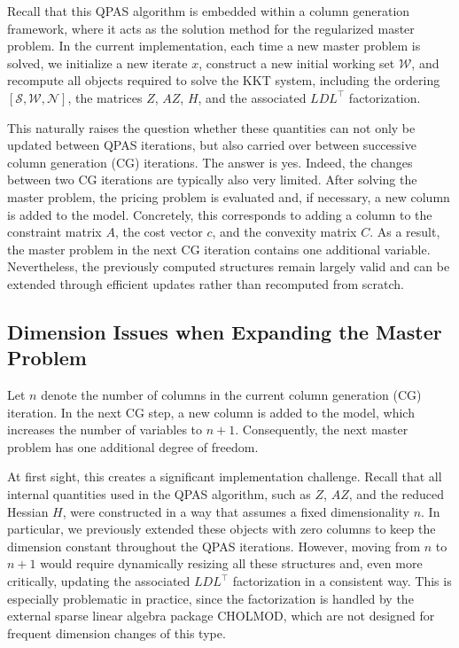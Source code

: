 \documentclass{book}
\theoremstyle{definition}
\newcounter{algorithm_}
\numberwithin{algorithm_}{chapter}
\begin{document}
{\bigskip

Recall that this QPAS algorithm is embedded within a column generation framework, where it acts as the solution method for the regularized master problem. In the current implementation, each time a new master problem is solved, we initialize a new iterate $x$, construct a new initial working set $\mathcal{W}$, and recompute all objects required to solve the KKT system, including the ordering $[\mathcal{S}, \mathcal{W}, \mathcal{N}]$, the matrices $Z$, $AZ$, $H$, and the associated $LDL^\top$ factorization.

\bigskip

This naturally raises the question whether these quantities can not only be updated between QPAS iterations, but also carried over between successive column generation (CG) iterations. The answer is yes. Indeed, the changes between two CG iterations are typically also very limited. After solving the master problem, the pricing problem is evaluated and, if necessary, a new column is added to the model. Concretely, this corresponds to adding a column to the constraint matrix $A$, the cost vector $c$, and the convexity matrix $C$. As a result, the master problem in the next CG iteration contains one additional variable. Nevertheless, the previously computed structures remain largely valid and can be extended through efficient updates rather than recomputed from scratch.


\subsection{Dimension Issues when Expanding the Master Problem}

Let $n$ denote the number of columns in the current column generation (CG) iteration. In the next CG step, a new column is added to the model, which increases the number of variables to $n+1$. Consequently, the next master problem has one additional degree of freedom.

\bigskip

At first sight, this creates a significant implementation challenge. Recall that all internal quantities used in the QPAS algorithm, such as $Z$, $AZ$, and the reduced Hessian $H$, were constructed in a way that assumes a fixed dimensionality $n$. In particular, we previously extended these objects with zero columns to keep the dimension constant throughout the QPAS iterations. However, moving from $n$ to $n+1$ would require dynamically resizing all these structures and, even more critically, updating the associated $LDL^\top$ factorization in a consistent way. This is especially problematic in practice, since the factorization is handled by the external sparse linear algebra package \textsc{CHOLMOD}, which are not designed for frequent dimension changes of this type.

}
\end{document}
